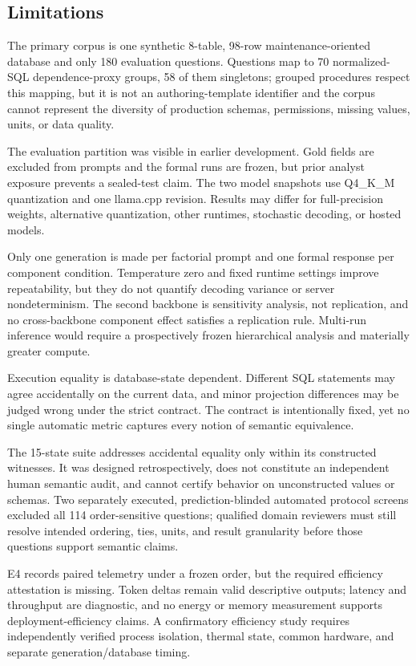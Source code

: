 \documentclass[applsci,article,submit,moreauthors]{Definitions/mdpi}
\begin{document}
\subsection{Limitations}
The primary corpus is one synthetic 8-table, 98-row maintenance-oriented database and only 180 evaluation questions. Questions map to 70 normalized-SQL dependence-proxy groups, 58 of them singletons; grouped procedures respect this mapping, but it is not an authoring-template identifier and the corpus cannot represent the diversity of production schemas, permissions, missing values, units, or data quality.

The evaluation partition was visible in earlier development. Gold fields are excluded from prompts and the formal runs are frozen, but prior analyst exposure prevents a sealed-test claim. The two model snapshots use Q4\_K\_M quantization and one llama.cpp revision. Results may differ for full-precision weights, alternative quantization, other runtimes, stochastic decoding, or hosted models.

Only one generation is made per factorial prompt and one formal response per component condition. Temperature zero and fixed runtime settings improve repeatability, but they do not quantify decoding variance or server nondeterminism. The second backbone is sensitivity analysis, not replication, and no cross-backbone component effect satisfies a replication rule. Multi-run inference would require a prospectively frozen hierarchical analysis and materially greater compute.

Execution equality is database-state dependent. Different SQL statements may agree accidentally on the current data, and minor projection differences may be judged wrong under the strict contract. The contract is intentionally fixed, yet no single automatic metric captures every notion of semantic equivalence.

The 15-state suite addresses accidental equality only within its constructed witnesses. It was designed retrospectively, does not constitute an independent human semantic audit, and cannot certify behavior on unconstructed values or schemas. Two separately executed, prediction-blinded automated protocol screens excluded all 114 order-sensitive questions; qualified domain reviewers must still resolve intended ordering, ties, units, and result granularity before those questions support semantic claims.

E4 records paired telemetry under a frozen order, but the required efficiency attestation is missing. Token deltas remain valid descriptive outputs; latency and throughput are diagnostic, and no energy or memory measurement supports deployment-efficiency claims. A confirmatory efficiency study requires independently verified process isolation, thermal state, common hardware, and separate generation/database timing.
\end{document}
